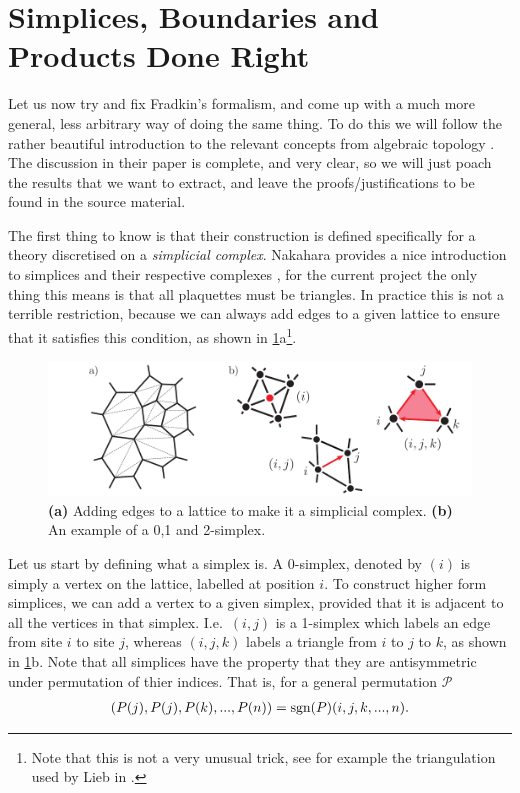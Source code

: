 \documentclass[11pt, oneside]{article} %
\numberwithin{equation}{section}
\begin{document}
\section{Simplices, Boundaries and Products Done Right}

Let us now try and fix Fradkin's formalism, and come up with a much more general, less arbitrary way of doing the same thing. To do this we will follow the rather beautiful introduction to the relevant concepts from algebraic topology \cite{schwalm_vector_1999}. The discussion in their paper is complete, and very clear, so we will just poach the results that we want to extract, and leave the proofs/justifications to be found in the source material. 

The first thing to know is that their construction is defined specifically for a theory discretised on a \textit{simplicial complex}. Nakahara provides a nice introduction to simplices and their respective complexes \cite{nakahara_geometry_2003}, for the current project the only thing this means is that all plaquettes must be triangles. In practice this is not a terrible restriction, because we can always add edges to a given lattice to ensure that it satisfies this condition, as shown in \cref{fig:simplices}a\footnote{Note that this is not a very unusual trick, see for example the triangulation used by Lieb in \cite{lieb_fluxes_2004}.}. 

\begin{figure}
    \centering
    \includegraphics[width=1\linewidth]{figs/simplces.pdf}
    \caption{
    \textbf{(a)} Adding edges to a lattice to make it a simplicial complex.
    \textbf{(b)} An example of a 0,1 and 2-simplex.
    }
    \label{fig:simplices}
\end{figure}

Let us start by defining what a simplex is. A 0-simplex, denoted by $(i)$ is simply a vertex on the lattice, labelled at position $i$. To construct higher form simplices, we can add a vertex to a given simplex, provided that it is adjacent to all the vertices in that simplex. I.e.~$(i,j)$ is a 1-simplex which labels an edge from site $i$ to site $j$, whereas $(i,j,k)$ labels a triangle from $i$ to $j$ to $k$, as shown in \cref{fig:simplices}b. Note that all simplices have the property that they are antisymmetric under permutation of thier indices. That is, for a general permutation $\mathcal P$
\begin{align}
    (P(j), P(j), P(k), ..., P(n)) = \textup{sgn}(P) (i,j,k,...,n).
\end{align}
\end{document}

